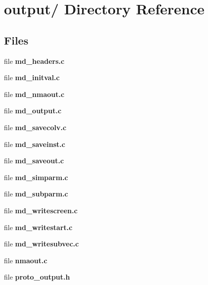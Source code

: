 \section{output/ Directory Reference}
\label{dir_5f1d95b1d236ddaf77bdd433d2f010a3}
\subsection*{Files}
\begin{CompactItemize}
\item 
file {\bf md\_\-headers.c}
\item 
file {\bf md\_\-initval.c}
\item 
file {\bf md\_\-nmaout.c}
\item 
file {\bf md\_\-output.c}
\item 
file {\bf md\_\-savecolv.c}
\item 
file {\bf md\_\-saveinst.c}
\item 
file {\bf md\_\-saveout.c}
\item 
file {\bf md\_\-simparm.c}
\item 
file {\bf md\_\-subparm.c}
\item 
file {\bf md\_\-writescreen.c}
\item 
file {\bf md\_\-writestart.c}
\item 
file {\bf md\_\-writesubvec.c}
\item 
file {\bf nmaout.c}
\item 
file {\bf proto\_\-output.h}
\end{CompactItemize}
